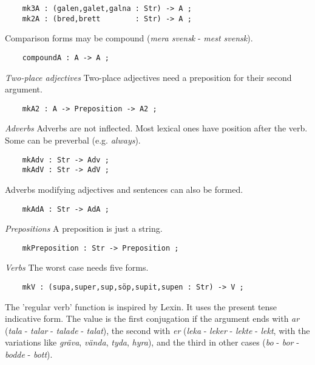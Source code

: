 \documentclass[11pt,a4paper]{article}
\newcommand{\subsubsubsection}[1]{\textit{#1}}
\begin{document}
\begin{verbatim}
    mk3A : (galen,galet,galna : Str) -> A ;
    mk2A : (bred,brett        : Str) -> A ;
\end{verbatim}

Comparison forms may be compound (\textit{mera svensk} - \textit{mest svensk}).

\begin{verbatim}
    compoundA : A -> A ;
\end{verbatim}

\subsubsubsection{Two-place adjectives}
Two-place adjectives need a preposition for their second argument.

\begin{verbatim}
    mkA2 : A -> Preposition -> A2 ;
\end{verbatim}

\subsubsubsection{Adverbs}
Adverbs are not inflected. Most lexical ones have position
after the verb. Some can be preverbal (e.g. \textit{always}).

\begin{verbatim}
    mkAdv : Str -> Adv ;
    mkAdV : Str -> AdV ;
\end{verbatim}

Adverbs modifying adjectives and sentences can also be formed.

\begin{verbatim}
    mkAdA : Str -> AdA ;
\end{verbatim}

\subsubsubsection{Prepositions}
A preposition is just a string.

\begin{verbatim}
    mkPreposition : Str -> Preposition ;
\end{verbatim}

\subsubsubsection{Verbs}
The worst case needs five forms.

\begin{verbatim}
    mkV : (supa,super,sup,söp,supit,supen : Str) -> V ;
\end{verbatim}

The 'regular verb' function is inspired by Lexin. It uses the
present tense indicative form. The value is the first conjugation if the
argument ends with \textit{ar} (\textit{tala} - \textit{talar} - \textit{talade} - \textit{talat}),
the second with \textit{er} (\textit{leka} - \textit{leker} - \textit{lekte} - \textit{lekt}, with the
variations like \textit{gräva}, \textit{vända}, \textit{tyda}, \textit{hyra}), and 
the third in other cases (\textit{bo} - \textit{bor} - \textit{bodde} - \textit{bott}).
\end{document}
